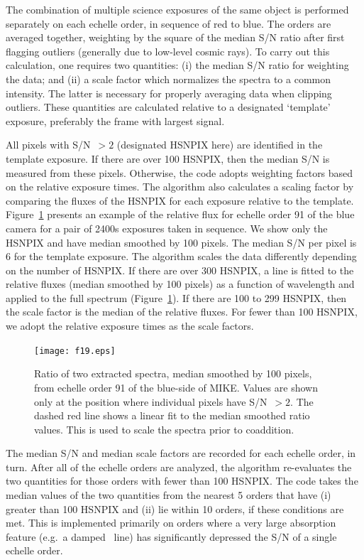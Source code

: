 \documentclass[]{emulateapj}
\begin{document}
The combination of multiple science exposures of the same object
is performed separately on each echelle order, in sequence of
red to blue.  The orders are averaged together, weighting by the square
of the median S/N ratio after first flagging outliers 
(generally due to low-level cosmic rays).
To carry out this calculation, one requires two quantities:
(i) the median S/N ratio for weighting the data; and
(ii) a scale factor which normalizes the spectra to a common
intensity.  The latter is necessary for properly averaging 
data when clipping outliers.
These quantities are calculated relative to a designated `template' 
exposure, preferably the frame with largest signal.

All pixels with S/N~$>2$ (designated HSNPIX here) are identified
in the template exposure.  If there are over 100 HSNPIX, then
the median S/N is measured from these pixels.  Otherwise, the
code adopts weighting factors based on the relative exposure times.
The algorithm also calculates a scaling factor by comparing the
fluxes of the HSNPIX for each exposure relative to the template.
Figure~\ref{fig:hsnpix} presents an example of the relative flux
for echelle order 91 of the blue camera for a pair of 2400s exposures
taken in sequence.  We show only the HSNPIX and have median smoothed
by 100 pixels.  The median S/N per pixel is 6 for the template
exposure.   The algorithm scales the data differently depending
on the number of HSNPIX.
If there are over 300 HSNPIX, a line is fitted to the relative
fluxes (median smoothed by 100 pixels)
as a function of wavelength and applied to the full spectrum  
(Figure~\ref{fig:hsnpix}).
If there are 100 to 299 HSNPIX, then the scale factor is the median of 
the relative fluxes.  For fewer than 100 HSNPIX, we adopt the relative
exposure times as the scale factors.


\begin{figure}
\texttt{[image: f19.eps]}
\caption{Ratio of two extracted spectra, median smoothed by
100 pixels,  from echelle order 91 of the blue-side of MIKE.
Values are shown only at the position where individual pixels 
have S/N~$>2$. The dashed red line shows a linear fit to the
median smoothed ratio values.
This is used to scale the spectra prior to coaddition.
}
\label{fig:hsnpix}
\end{figure}

The median S/N and median scale factors are recorded for each
echelle order, in turn.  After all of the echelle orders are
analyzed, the algorithm re-evaluates the two quantities for those
orders with fewer than 100 HSNPIX.  The code takes the median values
of the two quantities from the nearest 5 orders that have (i)
greater than 100 HSNPIX and (ii) lie within 10 orders, if these
conditions are met.  This is implemented primarily on
orders where a very large absorption feature (e.g.\ a damped \lya\ line)
has significantly depressed the S/N of a single echelle order.
\end{document}

